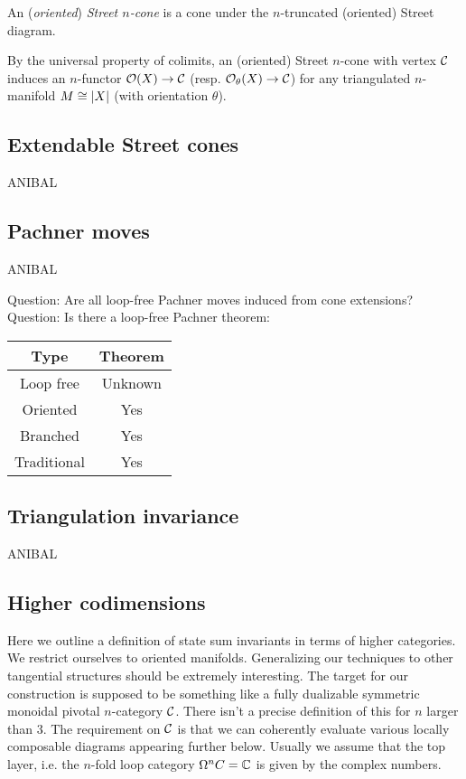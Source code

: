 An (\textit{oriented}) \textit{Street $n$-cone} is a cone under the $n$-truncated (oriented) Street diagram.

By the universal property of colimits, an (oriented) Street $n$-cone with vertex $\mathcal{C}$ induces an $n$-functor $\mathcal{O}(X) \to \mathcal{C}$ (resp. $\mathcal{O}_\theta(X) \to \mathcal{C}$) for any triangulated $n$-manifold $M \cong \lvert X\rvert$ (with orientation $\theta$).

\subsection{Extendable Street cones}

ANIBAL

\subsection{Pachner moves}

ANIBAL

Question: Are all loop-free Pachner moves induced from cone extensions?
Question: Is there a loop-free Pachner theorem:
\begin{center}
	\begin{tabular}{|c|c|}
		\hline
		Type & Theorem \\ \hline
		Loop free & Unknown \\
		Oriented & Yes \\
		Branched & Yes \\
		Traditional & Yes \\ \hline
	\end{tabular}
\end{center}

\subsection{Triangulation invariance}

ANIBAL

\subsection{Higher codimensions}



\newpage

Here we outline a definition of state sum invariants in terms of higher categories.
We restrict ourselves to oriented manifolds.
Generalizing our techniques to other tangential structures should be extremely interesting.
The target for our construction is supposed to be something like a fully dualizable symmetric monoidal pivotal $n$-category $\mathcal{C}$.
There isn't a precise definition of this for $n$ larger than 3. The requirement on $\mathcal{C}$ is that we can coherently evaluate various locally composable diagrams appearing further below.
Usually we assume that the top layer, i.e.
the $n$-fold loop category $\Omega^n C = \mathbb{C} $ is given by the complex numbers.

